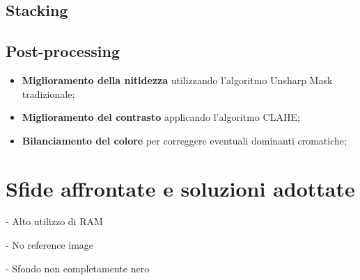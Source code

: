 \subsection{Stacking} \label{subsec:stacking_impl}

\subsection{Post-processing} \label{subsec:postprocessing_impl}

\begin{itemize}
    \item \textbf{Miglioramento della nitidezza} utilizzando l'algoritmo Unsharp Mask tradizionale;
    \item \textbf{Miglioramento del contrasto} applicando l'algoritmo CLAHE;
    \item \textbf{Bilanciamento del colore} per correggere eventuali dominanti cromatiche;
\end{itemize}

\section{Sfide affrontate e soluzioni adottate} \label{sec:challenges}

- Alto utilizzo di RAM 

- No reference image

- Sfondo non completamente nero 



\cleardoublepage